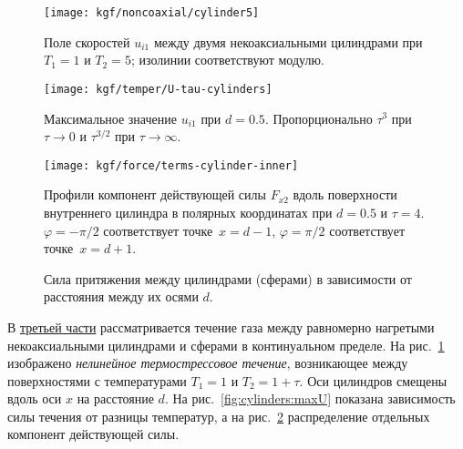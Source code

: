 
\begin{figure}
    \centering
    \texttt{[image: kgf/noncoaxial/cylinder5]}
    \caption{Поле скоростей \(u_{i1}\) между двумя некоаксиальными цилиндрами при \(T_1=1\) и \(T_2=5\);
        изолинии соответствуют модулю.}
    \label{fig:cylinders:velocity}
\end{figure}

\begin{figure}
    \centering
    \begin{minipage}{.48\textwidth}
        \texttt{[image: kgf/temper/U-tau-cylinders]}
        \caption{Максимальное значение \(u_{i1}\) при \(d=0.5\).
            Пропорционально \(\tau^3\) при \(\tau\to0\) и \(\tau^{3/2}\) при \(\tau\to\infty\).}
        \label{fig:cylinders:maxU}
    \end{minipage}
    \hfill
    \begin{minipage}{.48\textwidth}
        \texttt{[image: kgf/force/terms-cylinder-inner]}
        \caption{Профили компонент действующей силы \(F_{x2}\) вдоль поверхности внутреннего цилиндра
            в полярных координатах при \(d=0.5\) и \(\tau=4\).
            \(\varphi = -\pi/2\) соответствует точке~\(x=d-1\), \(\varphi = \pi/2\) соответствует точке~\(x=d+1\).}
        \label{fig:cylinders:terms_inner}
    \end{minipage}
\end{figure}

\begin{figure}
    \centering
    \caption{Сила притяжения между цилиндрами (сферами) в зависимости от расстояния между их осями \(d\).}
    \label{fig:cylinders:force}
\end{figure}

В \underline{третьей части} рассматривается течение газа между равномерно нагретыми
некоаксиальными цилиндрами и сферами в континуальном пределе.
На рис.~\ref{fig:cylinders:velocity} изображено \emph{нелинейное термострессовое течение},
возникающее между поверхностями с температурами \(T_1 = 1\) и \(T_2 = 1+\tau\).
Оси цилиндров смещены вдоль оси \(x\) на расстояние \(d\).
На рис.~\ref{fig:cylinders:maxU} показана зависимость силы течения от разницы температур,
а на рис.~\ref{fig:cylinders:terms_inner} распределение отдельных компонент действующей силы.

